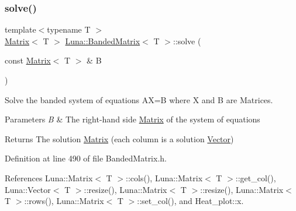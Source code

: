 \subsubsection{\texorpdfstring{solve()}{solve()}\hspace{0.1cm}{\footnotesize\ttfamily [2/2]}}
{\footnotesize\ttfamily template$<$typename T $>$ \\
\hyperlink{classLuna_1_1Matrix}{Matrix}$<$ T $>$ \hyperlink{classLuna_1_1BandedMatrix}{Luna\+::\+Banded\+Matrix}$<$ T $>$\+::solve (\begin{DoxyParamCaption}\item[{const \hyperlink{classLuna_1_1Matrix}{Matrix}$<$ T $>$ \&}]{B }\end{DoxyParamCaption})\hspace{0.3cm}{\ttfamily [inline]}}



Solve the banded system of equations AX=B where X and B are Matrices. 


\begin{DoxyParams}{Parameters}
{\em B} & The right-\/hand side \hyperlink{classLuna_1_1Matrix}{Matrix} of the system of equations \\
\hline
\end{DoxyParams}
\begin{DoxyReturn}{Returns}
The solution \hyperlink{classLuna_1_1Matrix}{Matrix} (each column is a solution \hyperlink{classLuna_1_1Vector}{Vector}) 
\end{DoxyReturn}


Definition at line 490 of file Banded\+Matrix.\+h.



References Luna\+::\+Matrix$<$ T $>$\+::cols(), Luna\+::\+Matrix$<$ T $>$\+::get\+\_\+col(), Luna\+::\+Vector$<$ T $>$\+::resize(), Luna\+::\+Matrix$<$ T $>$\+::resize(), Luna\+::\+Matrix$<$ T $>$\+::rows(), Luna\+::\+Matrix$<$ T $>$\+::set\+\_\+col(), and Heat\+\_\+plot\+::x.


